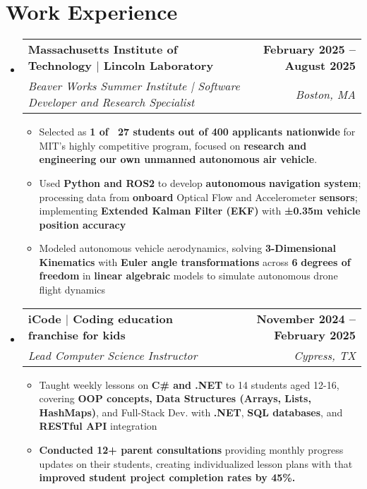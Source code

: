 \documentclass[letterpaper,11pt]{article}
\makeatletter
\newcommand{\resumeItem}[1]{
  \item\small{
    {#1 \vspace{0pt}}
  }
}
\newcommand{\resumeSubheading}[4]{
  \vspace{-2pt}\item
    \begin{tabular*}{1.0\textwidth}[t]{l@{\extracolsep{\fill}}r}
      \textbf{#1} & \textbf{\small #2} \\
      \textit{\small#3} & \textit{\small #4} \\
    \end{tabular*}\vspace{-7pt}
}
\newcommand{\resumeSubHeadingListStart}{\begin{itemize}[leftmargin=0.0in, label={}]}
\newcommand{\resumeSubHeadingListEnd}{\end{itemize}}\vspace{0pt}
\newcommand{\resumeItemListStart}{\begin{itemize}}
\newcommand{\resumeItemListEnd}{\end{itemize}\vspace{-5pt}}
\makeatother
\begin{document}
\section{Work Experience}
    \resumeSubHeadingListStart
                \resumeSubheading{Massachusetts Institute of Technology $|$ Lincoln Laboratory}{February 2025 -- August 2025}{Beaver Works Summer Institute | Software Developer and Research Specialist}{Boston, MA} 
                \resumeItemListStart
                    \resumeItem{Selected as \textbf{1 of ~27 students out of 400 applicants nationwide} for MIT’s highly competitive
program,  focused on \textbf{research and engineering our own unmanned autonomous air vehicle}.}
                    \resumeItem{Used \textbf{Python and ROS2} to develop \textbf{autonomous} \textbf{navigation system}; processing data from \textbf{onboard} Optical Flow and Accelerometer \textbf{sensors}; implementing \textbf{Extended Kalman Filter (EKF)}  with \textbf{±0.35m vehicle position accuracy}}
                    \resumeItem{Modeled autonomous vehicle aerodynamics, solving \textbf{3-Dimensional Kinematics} with \textbf{Euler angle transformation}\textbf{s} across \textbf{6} \textbf{degrees of freedom} in \textbf{linear algebraic} models to simulate autonomous drone flight dynamics}
                    \resumeItemListEnd
            \resumeSubheading{iCode $|$ Coding education franchise for kids}{November 2024 -- February 2025}{Lead Computer Science Instructor}{Cypress, TX} 
                \resumeItemListStart
                    \resumeItem{Taught weekly lessons on \textbf{C\# and .NET} to 14 students aged 12-16, covering \textbf{OOP concepts, Data Structures (Arrays, Lists, HashMaps)}, and Full-Stack Dev. with \textbf{.NET}, \textbf{SQL databases}, and \textbf{RESTful API} integration}
                    \resumeItem{\textbf{Conducted 12+ parent consultations }providing monthly progress updates on their students, creating individualized lesson plans with that \textbf{improved student project completion rates by 45\%.}}
                    \resumeItemListEnd
    
    \resumeSubHeadingListEnd
    \vspace{-12pt}

\end{document}
